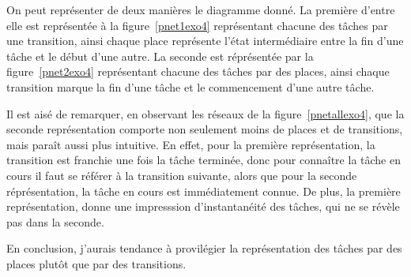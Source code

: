 On peut représenter de deux manières le diagramme donné. La première d'entre elle est représentée à
la figure~\ref{pnet1exo4} représentant chacune des tâches par une transition, ainsi chaque place
représente l'état intermédiaire entre la fin d'une tâche et le début d'une autre. La seconde est
réprésentée par la figure~\ref{pnet2exo4} représentant chacune des tâches par des places, ainsi
chaque transition marque la fin d'une tâche et le commencement d'une autre tâche.

Il est aisé de remarquer, en observant les réseaux de la figure~\ref{pnetallexo4}, que la seconde
représentation comporte non seulement moins de places et de transitions, mais paraît aussi plus
intuitive. En effet, pour la première représentation, la transition est franchie une fois la tâche
terminée, donc pour connaître la tâche en cours il faut se référer à la transition suivante, alors
que pour la seconde réprésentation, la tâche en cours est immédiatement connue. De plus, la première
représentation, donne une impresssion d'instantanéité des tâches, qui ne se révèle pas dans la
seconde. 

En conclusion, j'aurais tendance à provilégier la représentation des tâches par des places plutôt
que par des transitions.

